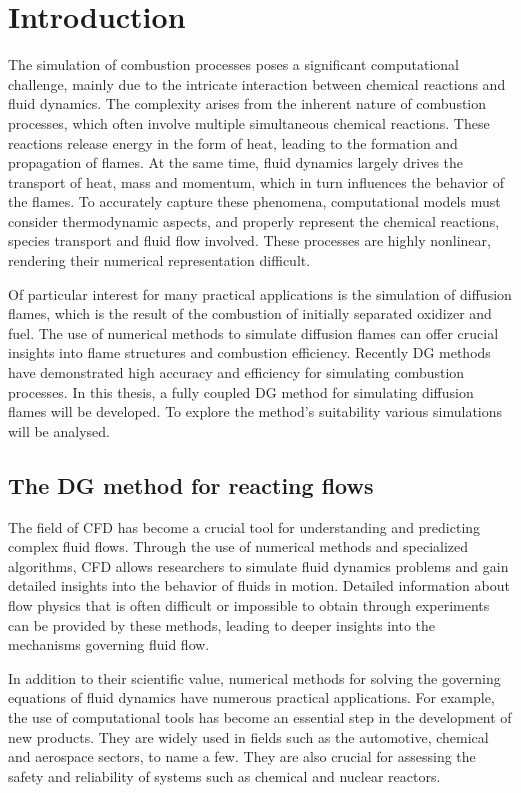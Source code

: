 \glsresetall
\chapter{Introduction}	\label{ch:introduction}
The simulation of combustion processes poses a significant computational challenge, mainly due to the intricate interaction between chemical reactions and fluid dynamics. The complexity arises from the inherent nature of combustion processes, which often involve multiple simultaneous chemical reactions. These reactions release energy in the form of heat, leading to the formation and propagation of flames. At the same time, fluid dynamics largely drives the transport of heat, mass and momentum, which in turn influences the behavior of the flames.  To accurately capture these phenomena, computational models must consider thermodynamic aspects, and properly represent the chemical reactions, species transport and fluid flow involved. These processes are highly nonlinear, rendering their numerical representation difficult.

Of particular interest for many practical applications is the simulation of diffusion flames, which is the result of the combustion of initially separated oxidizer and fuel. The use of numerical methods to simulate diffusion flames can offer crucial insights into flame structures and combustion efficiency. Recently \Gls{DG} methods have demonstrated high accuracy and efficiency for simulating combustion processes. In this thesis, a fully coupled \gls{DG} method for simulating diffusion flames will be developed. To explore the method's suitability various simulations will be analysed.

\section{The \Gls{DG} method for reacting flows}
The field of \Gls{CFD} has become a crucial tool for understanding and predicting complex fluid flows. Through the use of numerical methods and specialized algorithms, CFD allows researchers to simulate fluid dynamics problems and gain detailed insights into the behavior of fluids in motion. Detailed information about flow physics that is often difficult or impossible to obtain through experiments can be provided by these methods, leading to deeper insights into the mechanisms governing fluid flow. 

In addition to their scientific value, numerical methods for solving the governing equations of fluid dynamics have numerous practical applications. For example, the use of computational tools has become an essential step in the development of new products. They are widely used in fields such as the automotive, chemical and aerospace sectors, to name a few. They are also crucial for assessing the safety and reliability of systems such as chemical and nuclear reactors.

